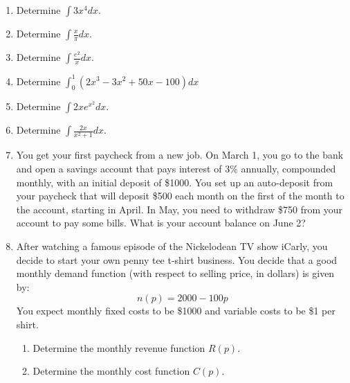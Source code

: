 \documentclass[letterpaper,12pt,fleqn]{article}
\begin{document}
\begin{enumerate}[left=0pt]
\item Determine \(\displaystyle\int3x^4dx\).

  \vspace{1.5in}

\item Determine \(\displaystyle\int\frac{x}{\pi}dx\).

  \vspace{1.5in}

\item Determine \(\displaystyle\int\frac{e^2}{x}dx\).

  \vspace{1.5in}

\item Determine \(\displaystyle\int_0^1(2x^3-3x^2+50x-100)dx\)

  \newpage

\item Determine \(\displaystyle\int{2xe^{x^2}}dx\).

  \vspace{4in}

\item Determine \(\displaystyle\int\frac{2x}{x^2+1}dx\).

  \newpage

\item You get your first paycheck from a new job.  On March 1, you go to the bank and open a savings account that pays interest
  of 3\% annually, compounded monthly, with an initial deposit of \$1000.  You set up an auto-deposit from your paycheck that
  will deposit \$500 each month on the first of the month to the account, starting in April.  In May, you need to withdraw
  \$750 from your account to pay some bills.  What is your account balance on June 2?

  \newpage

\item After watching a famous episode of the Nickelodean TV show iCarly, you decide to start your own penny tee t-shirt
  business.  You decide that a good monthly demand function (with respect to selling price, in dollars) is given by:
  \[n(p)=2000-100p\]
  You expect monthly fixed costs to be \$1000 and variable costs to be \$1 per shirt.
  \begin{enumerate}
  \item Determine the monthly revenue function \(R(p)\).

    \vspace{0.75in}

  \item Determine the monthly cost function \(C(p)\).


\end{enumerate}
\end{enumerate}
\end{document}
